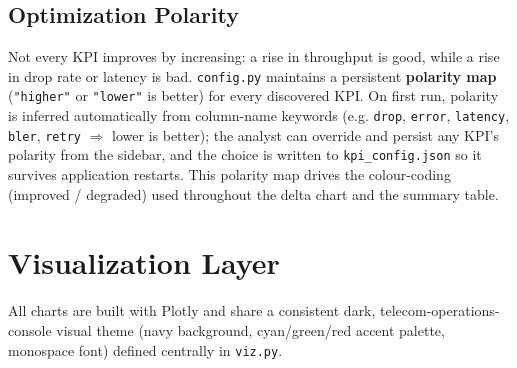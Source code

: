 \subsection{Optimization Polarity}
Not every KPI improves by increasing: a rise in throughput is good, while
a rise in drop rate or latency is bad. \texttt{config.py} maintains a
persistent \textbf{polarity map} (\texttt{"higher"} or \texttt{"lower"}
is better) for every discovered KPI. On first run, polarity is inferred
automatically from column-name keywords (e.g. \texttt{drop}, \texttt{error},
\texttt{latency}, \texttt{bler}, \texttt{retry} $\Rightarrow$ lower is
better); the analyst can override and persist any KPI's polarity from the
sidebar, and the choice is written to \texttt{kpi\_config.json} so it
survives application restarts. This polarity map drives the colour-coding
(improved / degraded) used throughout the delta chart and the summary
table.

\section{Visualization Layer}
All charts are built with Plotly and share a consistent dark,
telecom-operations-console visual theme (navy background, cyan/green/red
accent palette, monospace font) defined centrally in \texttt{viz.py}.

